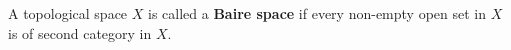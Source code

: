 A topological space $X$ is called a \textbf{Baire space} if every non-empty open set in $X$ is of second category in $X$.
